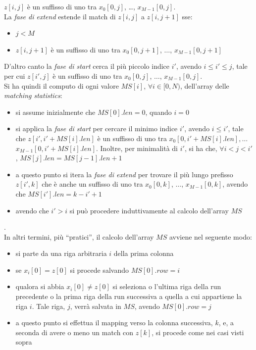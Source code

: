 $z[i,j]$ è un suffisso di uno tra $x_0[0,j]$, \ldots, $x_{M-1}[0,j]$. \\
La \textit{fase di extend}  estende il match di $z[i,j]$ a $z[i,j+1]$ sse:
\begin{itemize}
  \item $j<M$
  \item $z[i,j+1]$ è un suffisso di uno tra $x_0[0,j+1]$, $\ldots$,
  $x_{M-1}[0,j+1]$ 
\end{itemize}
D'altro canto la \textit{fase di start} cerca il più piccolo indice $i'$,
avendo $i\leq i'\leq j$, tale per cui $z[i',j]$ è un suffisso di uno tra
$x_0[0,j]$, $\ldots$, $x_{M-1}[0,j]$.\\
Si ha quindi il computo di ogni valore $MS[i]$, $\forall i\in[0,N)$, dell'array
delle \textit{matching statistics}:
\begin{itemize}
  \item si assume inizialmente che $MS[0].len=0$, quando $i=0$
  \item si applica la \textit{fase di start} per cercare il minimo indice
  $i'$, avendo $i\leq i'$, tale che $z[i',i'+MS[i].len]$ è un suffisso di uno
  tra $x_0[0,i'+MS[i].len], \ldots$ $x_{M-1}[0,i'+MS[i].len]$. Inoltre, per
  minimalità di $i'$, si ha che, $\forall i<j<i'$, $MS[j].len=MS[j-1].len+1$
  \item a questo punto si itera la \textit{fase di extend} per trovare il
  più lungo prefisso $z[i',k]$ che è anche un suffisso di uno tra $x_0[0,k]$,
  $\ldots$, $x_{M-1}[0,k]$, avendo che $MS[i'].len=k-i'+1$
  \item avendo che $i'>i$ si può procedere induttivamente al calcolo dell'array
  $MS$ 
\end{itemize}
.\\ 
In altri termini, più ``pratici'', il calcolo dell'array $MS$ avviene nel
seguente modo:
\begin{itemize}
  \item si parte da una riga arbitraria $i$ della prima colonna
  \item se $x_i[0]=z[0]$ si procede salvando $MS[0].row=i$
  \item qualora si abbia $x_i[0]\neq z[0]$ si seleziona o l'ultima riga della
  run precedente o la prima riga della run successiva a quella a cui appartiene
  la riga $i$. Tale riga, $j$, verrà salvata in $MS$, avendo $MS[0].row=j$
  \item a questo punto si effettua il mapping verso la colonna successiva, $k$,
  e, a seconda di avere o meno un match con $z[k]$, si procede come nei casi
  visti sopra 
\end{itemize}

